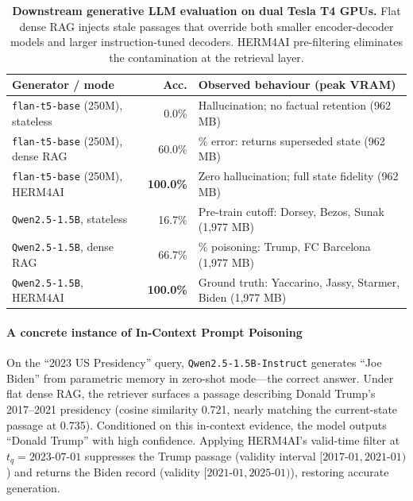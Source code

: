 \documentclass[11pt,a4paper,twocolumn]{article}
\newcommand{\herm}{\textsc{HERM4AI}}
\begin{document}
\begin{table}[h]
\centering
\footnotesize
\setlength{\tabcolsep}{3pt}
\begin{tabularx}{\columnwidth}{
  >{\raggedright\arraybackslash}p{2.4cm}
  r
  >{\raggedright\arraybackslash}X}
\toprule
\textbf{Generator / mode} & \textbf{Acc.} & \textbf{Observed behaviour (peak VRAM)} \\
\midrule
\texttt{flan-t5-base} (250M), stateless & 0.0\% & Hallucination; no factual retention (962 MB) \\
\texttt{flan-t5-base} (250M), dense RAG & 60.0\% & 40\% error: returns superseded state (962 MB) \\
\texttt{flan-t5-base} (250M), \herm{} & \textbf{100.0\%} & Zero hallucination; full state fidelity (962 MB) \\
\texttt{Qwen2.5-1.5B}, stateless & 16.7\% & Pre-train cutoff: Dorsey, Bezos, Sunak (1{,}977 MB) \\
\texttt{Qwen2.5-1.5B}, dense RAG & 66.7\% & 33.3\% poisoning: Trump, FC Barcelona (1{,}977 MB) \\
\texttt{Qwen2.5-1.5B}, \herm{} & \textbf{100.0\%} & Ground truth: Yaccarino, Jassy, Starmer, Biden (1{,}977 MB) \\
\bottomrule
\end{tabularx}
\caption{\textbf{Downstream generative LLM evaluation on dual Tesla T4 GPUs.}
Flat dense RAG injects stale passages that override both smaller
encoder-decoder models and larger instruction-tuned decoders.
\herm{} pre-filtering eliminates the contamination at the retrieval
layer.}
\label{tab:generative_llm}
\end{table}

\paragraph{A concrete instance of In-Context Prompt Poisoning}
On the ``2023 US Presidency'' query, \texttt{Qwen2.5-1.5B-Instruct}
generates ``Joe Biden'' from parametric memory in zero-shot mode---the
correct answer.  Under flat dense RAG, the retriever surfaces a passage
describing Donald Trump's 2017--2021 presidency (cosine similarity
0.721, nearly matching the current-state passage at 0.735).  Conditioned
on this in-context evidence, the model outputs ``Donald Trump'' with
high confidence.  Applying \herm{}'s valid-time filter at $t_q =
\text{2023-07-01}$ suppresses the Trump passage (validity interval
$[2017\text{-}01, 2021\text{-}01)$) and returns the Biden record
(validity $[2021\text{-}01, 2025\text{-}01)$), restoring accurate
generation.
\end{document}
